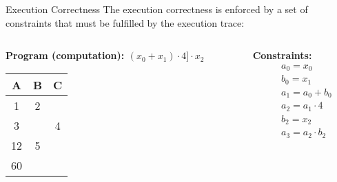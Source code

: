 \begin{frame}{Execution Correctness}
The execution correctness is enforced by a set of constraints that must be fulfilled by the execution trace:

\vspace{1em}
\begin{columns}[t]
\begin{column}{0.2\columnwidth}
\centering
\textbf{Program (computation): $(x_0+x_1)\cdot 4]\cdot x_2$} \\
\vspace{1em}
\begin{tabular}{|c|c|c|}
\hline
\textbf{A} & \textbf{B} & \cellcolor{lightgray} \textbf{C} \\ \hline
1 & 2 & \cellcolor{lightgray} \\ \hline
3 & & \cellcolor{lightgray} 4 \\ \hline
12 & 5 & \cellcolor{lightgray} \\ \hline
60 & & \cellcolor{lightgray} \\ \hline
\end{tabular}
\end{column}

\begin{column}{0.5 \columnwidth}
\centering
\vspace{-.5em}
\textbf{Constraints:}
\begin{align*}
&a_0 = x_0 \\
&b_0 = x_1 \\
&a_1 = a_0 + b_0 \\
&a_2 = a_1 \cdot 4 \\
&b_2 = x_2 \\
&a_3 = a_2 \cdot b_2
\end{align*}
\end{column}
\end{columns}
\end{frame}





